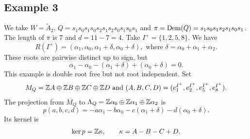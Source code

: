\subsection{Example 3}
We take $W=\widetilde A_2$,
$Q=s_1s_0s_1s_0s_2s_1s_2s_0s_1s_0s_1$ and
$\pi=\operatorname{Dem}(Q)=s_1s_0s_1s_2s_1s_0s_1$.
The length of $\pi$ is $7$ and $d=11-7=4$. Take
$I^+=\{1,2,5,8\}$. We have
\[
R(I^+)=(\alpha_1,\alpha_0,\alpha_1+\delta,\alpha_0+\delta),
\text{ where }\delta=\alpha_0+\alpha_1+\alpha_2.
\]
These roots are pairwise distinct up to sign, but
\[
\alpha_1-\alpha_0-(\alpha_1+\delta)+(\alpha_0+\delta)=0.
\]
This example is double root free but not root independent. 
Set
\[
M_Q=\mathbb Z A\oplus\mathbb Z B\oplus\mathbb Z C\oplus\mathbb Z D
\text{ and }
(A,B,C,D)=(e_1^{I^+},e_2^{I^+},e_5^{I^+},e_8^{I^+}).
\]
The projection from $M_Q$ to
$\Lambda_Q=\mathbb Z\alpha_0\oplus\mathbb Z\alpha_1\oplus\mathbb Z\alpha_2$ is
\begin{equation}\label{eq:int-P3-p}
p(a,b,c,d)=-a\alpha_1-b\alpha_0-c(\alpha_1+\delta)-d(\alpha_0+\delta).
\end{equation}
Its kernel is
\[
\ker p=\mathbb Z\kappa,\qquad \kappa=A-B-C+D.
\]

